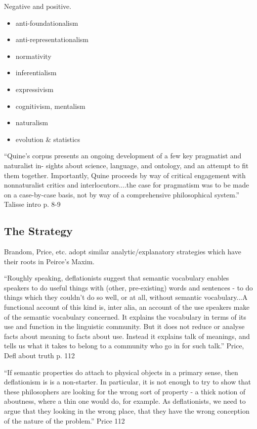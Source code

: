 \documentclass[11pt,twoside]{article}
\begin{document}
Negative and positive.

\begin{itemize}
\item anti-foundationalism
\item anti-representationalism
\item normativity
\item inferentialism
\item expressivism
\item cognitivism, mentalism
\item naturalism
\item evolution \& statistics
\end{itemize}

``Quine’s corpus presents an ongoing development of a few key
pragmatist and naturalist in- sights about science, language, and
ontology, and an attempt to fit them together. Importantly, Quine
proceeds by way of critical engagement with nonnaturalist critics and
interlocutors....the case for pragmatism was to be made on a
case-by-case basis, not by way of a comprehensive philosophical
system.'' Talisse intro p. 8-9

\subsection{The Strategy}

Brandom, Price, etc. adopt similar analytic/explanatory strategies which have
their roots in Peirce's Maxim.

``Roughly speaking, deflationists suggest that semantic vocabulary enables speakers to do useful things with (other, pre-existing) words and sentences - to do things which they couldn't do so well, or at all, without semantic vocabulary...A functional account of this kind is, inter alia, an account of the use speakers make of the semantic vocabulary concerned. It explains the vocabulary in terms of its use and function in the linguistic community. But it does not reduce or analyse facts about meaning to facts about use. Instead it explains talk of meanings, and tells us what it takes to belong to a community who go in for such talk.'' Price, Defl about truth p. 112

``If semantic properties do attach to physical objects in a primary sense, then deflationism is is a non-starter. In particular, it is not enough to try to show that these philosophers are looking for the wrong sort of property - a thick notion of aboutness, where a thin one would do, for example. As deflationists, we need to argue that they looking in the wrong place, that they have the wrong conception of the nature of the problem.'' Price 112
\end{document}
